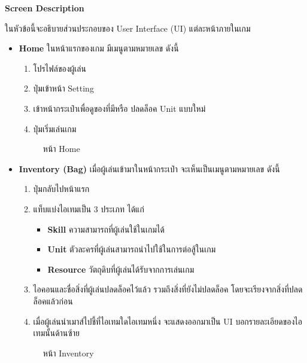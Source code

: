 \documentclass[12pt,oneside,openright,a4paper]{cpe-thai-project}
\begin{document}
\textbf{Screen Description}

ในหัวข้อนี้จะอธิบายส่วนประกอบของ User Interface (UI) แต่ละหน้าภายในเกม

\begin{itemize}
  \item \textbf{Home} ในหน้าแรกของเกม มีเมนูตามหมายเลข ดังนี้
  \begin{enumerate}
    \item โปรไฟล์ของผู้เล่น
    \item ปุ่มเข้าหน้า Setting
    \item เข้าหน้ากระเป๋าเพื่อดูของที่มีหรือ ปลดล็อค Unit แบบใหม่
    \item ปุ่มเริ่มเล่นเกม
  \end{enumerate}

  \begin{figure}[H]\centering
    \setlength{\fboxsep}{0cm}
    \caption{หน้า Home}\label{fig:3-9}
  \end{figure}

  \pagebreak
  \item \textbf{Inventory (Bag)} เมื่อผู้เล่นเข้ามาในหน้ากระเป๋า 
  จะเห็นเป็นเมนูตามหมายเลข ดังนี้
  \begin{enumerate}
    \item ปุ่มกลับไปหน้าแรก
    \item แท็บแบ่งไอเทมเป็น 3 ประเภท ได้แก่
    \begin{itemize}
      \item \textbf{Skill} ความสามารถที่ผู้เล่นใช้ในเกมได้
      \item \textbf{Unit} ตัวละครที่ผู้เล่นสามารถนำไปใช้ในการต่อสู้ในเกม
      \item \textbf{Resource} วัตถุดิบที่ผู้เล่นได้รับจากการเล่นเกม
    \end{itemize}
    \item ไอคอนและชื่อสิ่งที่ผู้เล่นปลดล็อคไว้แล้ว 
    รวมถึงสิ่งที่ยังไม่ปลดล็อค โดยจะเรียงจากสิ่งที่ปลดล็อคแล้วก่อน
    \item เมื่อผู้เล่นนำเมาส์ไปชี้ที่ไอเทมใดไอเทมหนึ่ง 
    จะแสดงออกมาเป็น UI บอกรายละเอียดของไอเทมนั้นด้านซ้าย
  \end{enumerate}

  \begin{figure}[H]\centering
    \setlength{\fboxsep}{0cm}
    \caption{หน้า Inventory}\label{fig:3-10}
  \end{figure}


\end{itemize}
\end{document}
